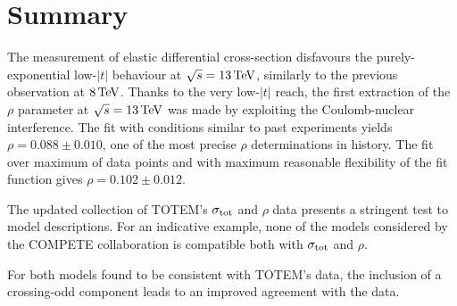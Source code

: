 \section{Summary}
\label{sec:summary}

The measurement of elastic differential cross-section disfavours the purely-exponential low-$|t|$ behaviour at $\sqrt s = 13\,{\rm TeV}$, similarly to the previous observation at $8\,{\rm TeV}$. Thanks to the very low-$|t|$ reach, the first extraction of the $\rho$ parameter at $\sqrt s = 13\,{\rm TeV}$ was made by exploiting the Coulomb-nuclear interference. The fit with conditions similar to past experiments yields $\rho = 0.088 \pm 0.010$, one of the most precise $\rho$ determinations in history. The fit over maximum of data points and with maximum reasonable flexibility of the fit function gives $\rho = 0.102 \pm 0.012$.

The updated collection of TOTEM's $\sigma_{\rm tot}$ and $\rho$ data presents a stringent test to model descriptions. For an indicative example, none of the models considered by the COMPETE collaboration is compatible both with $\sigma_{\rm tot}$ and $\rho$.

For both models found to be consistent with TOTEM's data, the inclusion of a crossing-odd component leads to an improved agreement with the data.
